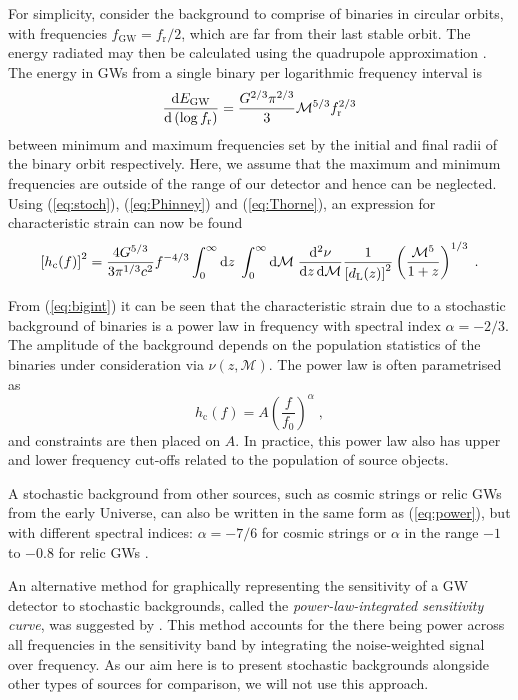 For simplicity, consider the background to comprise of binaries in circular orbits, with frequencies $f_\mathrm{GW} =f_{\mathrm{r}}/2$, which are far from their last stable orbit. The energy radiated may then be calculated using the quadrupole approximation \citep{petersmathews1963}. The energy in GWs from a single binary per logarithmic frequency interval is
\begin{equation}\label{eq:Thorne}
\frac{\mathrm{d}E_{\mathrm{GW}}}{\mathrm{d}\left(\log f_{\mathrm{r}} \right)} = \frac{G^{2/3}\pi^{2/3}}{3}{\cal{M}}^{5/3}f_{\mathrm{r}}^{2/3}
\end{equation}
between minimum and maximum frequencies set by the initial and final radii of the binary orbit respectively. Here, we assume that the maximum and minimum frequencies are outside of the range of our detector and hence can be neglected. Using (\ref{eq:stoch}), (\ref{eq:Phinney}) and (\ref{eq:Thorne}), an expression for characteristic strain can now be found \citep{SesanaVecchioColancino}
\begin{equation}\label{eq:bigint}
\left[h_\mathrm{c}(f)\right]^2 = \frac{4G^{5/3}}{3\pi^{1/3}c^{2}}f^{-4/3}\int_{0}^{\infty}\mathrm{d}z\;\int_{0}^{\infty}\mathrm{d}{\cal{M}}\;\frac{\mathrm{d}^{2}\nu}{\mathrm{d}z\,\mathrm{d}{\mathcal{M}}}\frac{1}{\left[d_{\mathrm{L}}(z)\right]^2}\left( \frac{{\mathcal{M}}^{5}}{1+z} \right)^{1/3}\; .
\end{equation}

From (\ref{eq:bigint}) it can be seen that the characteristic strain due to a stochastic background of binaries is a power law in frequency with spectral index $\alpha=-2/3$. The amplitude of the background depends on the population statistics of the binaries under consideration via $\nu(z,{\mathcal{M}})$. The power law is often parametrised as
\begin{equation}\label{eq:power} 
h_\mathrm{c}(f) = A\left(\frac{f}{f_{0}}\right)^{\alpha}\; , 
\end{equation}
and constraints are then placed on $A$. In practice, this power law also has upper and lower frequency cut-offs related to the population of source objects.

A stochastic background from other sources, such as cosmic strings or relic GWs from the early Universe, can also be written in the same form as (\ref{eq:power}), but with different spectral indices: $\alpha=-7/6$ for cosmic strings or $\alpha$ in the range $-1$ to $-0.8$ for relic GWs \citep{Jenet}.

An alternative method for graphically representing the sensitivity of a GW detector to stochastic backgrounds, called the \emph{power-law-integrated sensitivity curve}, was suggested by \cite{2013PhRvD..88l4032T}. This method accounts for the there being power across all frequencies in the sensitivity band by integrating the noise-weighted signal over frequency. As our aim here is to present stochastic backgrounds alongside other types of sources for comparison, we will not use this approach.


